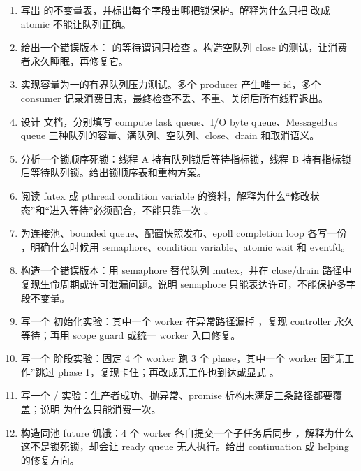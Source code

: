 \begin{exercisebox}
\begin{enumerate}
  \item 写出  的不变量表，并标出每个字段由哪把锁保护。解释为什么只把  改成 atomic 不能让队列正确。
  \item 给出一个错误版本： 的等待谓词只检查 。构造空队列 close 的测试，让消费者永久睡眠，再修复它。
  \item 实现容量为一的有界队列压力测试。多个 producer 产生唯一 id，多个 consumer 记录消费日志，最终检查不丢、不重、关闭后所有线程退出。
  \item 设计  文档，分别填写 compute task queue、I/O byte queue、MessageBus queue 三种队列的容量、满队列、空队列、close、drain 和取消语义。
  \item 分析一个锁顺序死锁：线程 A 持有队列锁后等待指标锁，线程 B 持有指标锁后等待队列锁。给出锁顺序表和重构方案。
  \item 阅读 futex 或 pthread condition variable 的资料，解释为什么“修改状态”和“进入等待”必须配合，不能只靠一次 。
  \item 为连接池、bounded queue、配置快照发布、epoll completion loop 各写一份 ，明确什么时候用 semaphore、condition variable、atomic wait 和 eventfd。
  \item 构造一个错误版本：用 semaphore 替代队列 mutex，并在 close/drain 路径中复现生命周期或许可泄漏问题。说明 semaphore 只能表达许可，不能保护多字段不变量。
  \item 写一个  初始化实验：其中一个 worker 在异常路径漏掉 ，复现 controller 永久等待；再用 scope guard 或统一 worker 入口修复。
  \item 写一个  阶段实验：固定 4 个 worker 跑 3 个 phase，其中一个 worker 因“无工作”跳过 phase 1，复现卡住；再改成无工作也到达或显式 。
  \item 写一个 / 实验：生产者成功、抛异常、promise 析构未满足三条路径都要覆盖；说明  为什么只能消费一次。
  \item 构造同池 future 饥饿：4 个 worker 各自提交一个子任务后同步 ，解释为什么这不是锁死锁，却会让 ready queue 无人执行。给出 continuation 或 helping 的修复方向。
\end{enumerate}
\end{exercisebox}
